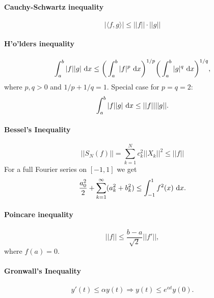 \documentclass[a4paper, 11pt, notitlepage, english]{article}
\renewcommand{\d}{{\rm d}}
\begin{document}
\paragraph{Cauchy-Schwartz inequality}
$$|\langle f, g \rangle | \leq ||f|| \cdot ||g|| $$
\paragraph{H'o'lders inequality}
$$\int_a^b |f||g| \ \d x \leq \bigg(\int_a^b |f|^p\ \d x\bigg)^{1/p} \bigg(\int_a^b |g|^q \ \d x\bigg)^{1/q},$$
where $p,q>0$ and $1/p + 1/q = 1$. Special case for $p=q=2$:
$$\int_a^b |f||g| \ \d x \leq ||f|| ||g||.$$
\paragraph{Bessel's Inequality}
$$||S_N(f)|| = \sum_{k=1}^N c_k^2||X_k||^2 \leq ||f|| $$
For a full Fourier series on $[-1,1]$ we get
$$\frac{a_0^2}{2} + \sum_{k=1}^\infty(a_k^2 + b_k^2) \leq \int_{-1}^1 f^2(x) \ \d x.$$
\paragraph{Poincare inequality}
$$||f|| \leq \frac{b-a}{\sqrt{2}}||f'||,$$
where $f(a) = 0$.
\paragraph{Gronwall's Inequality}
$$y'(t)\leq \alpha y(t) \Rightarrow y(t) \leq e^{\alpha t}y(0).$$
\end{document}
